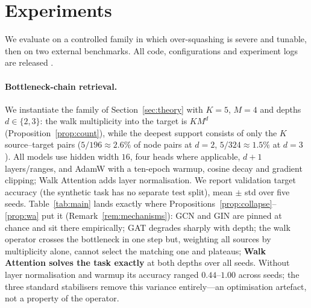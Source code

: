 \documentclass[runningheads]{llncs}
\begin{document}
\section{Experiments}\label{sec:exp}

We evaluate on a controlled family in which over-squashing is severe and
tunable, then on two external benchmarks. All code, configurations and
experiment logs are released \cite{repo_walkattention}.

\paragraph{Bottleneck-chain retrieval.}
We instantiate the family of Section~\ref{sec:theory} with $K{=}5$, $M{=}4$ and
depths $d\in\{2,3\}$: the walk multiplicity into the target is $KM^d$
(Proposition~\ref{prop:count}), while the deepest support consists of only the
$K$ source--target pairs ($5/196\approx2.6\%$ of node pairs at $d{=}2$,
$5/324\approx1.5\%$ at $d{=}3$). All models use hidden width $16$, four heads
where applicable, $d{+}1$ layers/ranges, and AdamW with a ten-epoch warmup,
cosine decay and gradient clipping; Walk Attention adds layer normalisation. We
report validation target accuracy (the synthetic task has no separate test
split), mean $\pm$ std over five seeds. Table~\ref{tab:main} lands exactly
where Propositions~\ref{prop:collapse}--\ref{prop:wa} put it
(Remark~\ref{rem:mechanisms}): GCN and GIN are pinned at chance and sit there
empirically; GAT degrades sharply with depth; the walk operator crosses the
bottleneck in one step but, weighting all sources by multiplicity alone,
cannot select the matching one and plateaus; \textbf{Walk Attention solves the
task exactly} at both depths over all seeds. Without layer normalisation and
warmup its accuracy ranged $0.44$--$1.00$ across seeds; the three standard
stabilisers remove this variance entirely---an optimisation artefact, not a
property of the operator.
\end{document}

